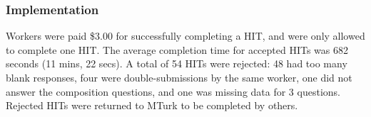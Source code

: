 

\subsubsection{Implementation}
Workers were paid \$3.00 for successfully completing a HIT, and were only allowed to complete  one HIT.  The average completion time for accepted HITs was 682 seconds (11 mins, 22 secs).
A total of 54 HITs were rejected: 48 had too many blank responses, four were double-submissions by the same worker, one  did not answer the composition questions, and one was missing data for 3 questions.  Rejected HITs were returned to MTurk to be completed by others.


